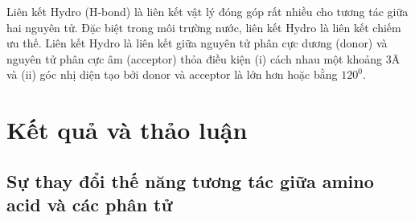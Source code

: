 \documentclass[12pt,a4paper,reqno, oneside]{book}
\begin{document}
	Liên kết Hydro (H-bond) là liên kết vật lý đóng góp rất nhiều cho tương tác giữa hai nguyên tử. Đặc biệt trong môi trường nước, liên kết Hydro là liên kết chiếm ưu thế.
	Liên kết Hydro là liên kết giữa nguyên tử phân cực dương (donor) và nguyên tử phân cực âm (acceptor) thỏa điều kiện (i) cách nhau một khoảng 3\={A} và (ii) góc nhị diện tạo bởi donor và acceptor là lớn hơn hoặc bằng $ 120^{0} $.


\newpage
\pagestyle{fancy}
\setcounter{chapter}{2}
\chapter{Kết quả và thảo luận}
%
\section{Sự thay đổi thế năng tương tác giữa amino acid và các phân tử }
\end{document}
